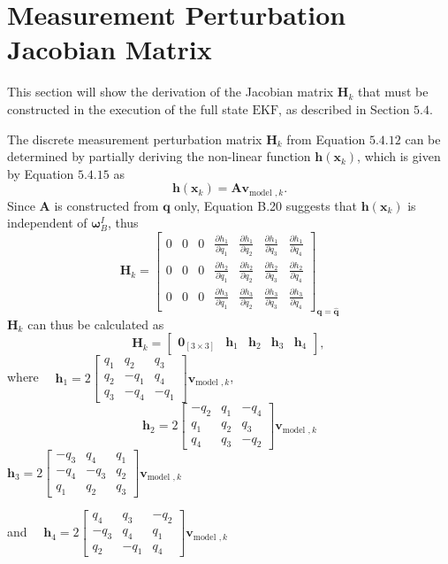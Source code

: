 \chapter{Measurement Perturbation Jacobian Matrix}
\label{chap:Measurement Perturbation Jacobian Matrix}
This section will show the derivation of the Jacobian matrix $\mathbf{H}_{k}$ that must be constructed in the execution of the full state $\mathrm{EKF}$, as described in Section $5.4 .$

The discrete measurement perturbation matrix $\mathbf{H}_{k}$ from Equation $5.4 .12$ can be determined by partially deriving the non-linear function $\boldsymbol{h}\left(\mathbf{x}_{k}\right)$, which is given by Equation $5.4 .15$ as
$$
\boldsymbol{h}\left(\mathbf{x}_{k}\right)=\mathbf{A} \mathbf{v}_{\text {model }, k} .
$$
Since $\mathbf{A}$ is constructed from $\mathbf{q}$ only, Equation B.20 suggests that $\boldsymbol{h}\left(\mathbf{x}_{k}\right)$ is independent of $\boldsymbol{\omega}_{B}^{I}$, thus
$$
\mathbf{H}_{k}=\left[\begin{array}{lllllll}
0 & 0 & 0 & \frac{\partial h_{1}}{\partial q_{1}} & \frac{\partial h_{1}}{\partial q_{2}} & \frac{\partial h_{1}}{\partial q_{3}} & \frac{\partial h_{1}}{\partial q_{4}} \\
0 & 0 & 0 & \frac{\partial h_{2}}{\partial q_{1}} & \frac{\partial h_{2}}{\partial q_{2}} & \frac{\partial h_{2}}{\partial q_{3}} & \frac{\partial h_{2}}{\partial q_{4}} \\
0 & 0 & 0 & \frac{\partial h_{3}}{\partial q_{1}} & \frac{\partial h_{3}}{\partial q_{2}} & \frac{\partial h_{3}}{\partial q_{3}} & \frac{\partial h_{3}}{\partial q_{4}}
\end{array}\right]_{\mathbf{q}=\hat{\mathbf{q}}}
$$
$\mathbf{H}_{k}$ can thus be calculated as
$$
\mathbf{H}_{k}=\left[\begin{array}{lllll}
\mathbf{0}_{[3 \times 3]} & \mathbf{h}_{1} & \mathbf{h}_{2} & \mathbf{h}_{3} & \mathbf{h}_{4}
\end{array}\right] \text {, }
$$
where $\quad \mathbf{h}_{1}=2\left[\begin{array}{ccc}q_{1} & q_{2} & q_{3} \\ q_{2} & -q_{1} & q_{4} \\ q_{3} & -q_{4} & -q_{1}\end{array}\right] \mathbf{v}_{\text {model }, k}$,
$$
\mathbf{h}_{2}=2\left[\begin{array}{ccc}
-q_{2} & q_{1} & -q_{4} \\
q_{1} & q_{2} & q_{3} \\
q_{4} & q_{3} & -q_{2}
\end{array}\right] \mathbf{v}_{\text {model }, k}
$$
$\mathbf{h}_{3}=2\left[\begin{array}{ccc}-q_{3} & q_{4} & q_{1} \\ -q_{4} & -q_{3} & q_{2} \\ q_{1} & q_{2} & q_{3}\end{array}\right] \mathbf{v}_{\text {model }, k}$

and $\quad \mathbf{h}_{4}=2\left[\begin{array}{ccc}q_{4} & q_{3} & -q_{2} \\ -q_{3} & q_{4} & q_{1} \\ q_{2} & -q_{1} & q_{4}\end{array}\right] \mathbf{v}_{\text {model }, k}$

